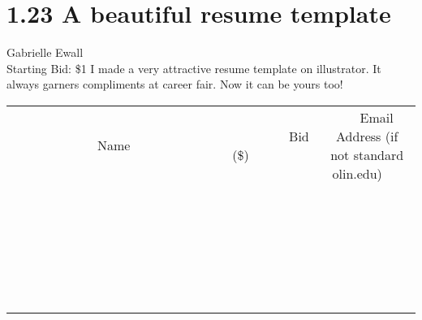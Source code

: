 \documentclass[11pt]{article}
\begin{document}
\section*{1.23 A beautiful resume template }
Gabrielle Ewall
\\
Starting Bid: \$1
\newline
I made a very attractive resume template on illustrator. It always garners compliments at career fair. Now it can be yours too!
\\[6ex]
\begin{tabular}{c c c}
~~~~~~~~~~~~~Name~~~~~~~~~~~~~ & ~~~~~~~~~Bid (\$)~~~~~~~~~  & ~~~Email Address (if not standard olin.edu)~~~\\
 & & \\
\hline
 & & \\
\hline
 & & \\
\hline
 & & \\
\hline
 & & \\
\hline
 & & \\
\hline
 & & \\
\hline
 & & \\
\hline
 & & \\
\hline
 & & \\
\hline
 & & \\
\hline
 & & \\
\hline
 & & \\
\hline
 & & \\
\hline
 & & \\
\hline
 & & \\
\hline
 & & \\
\hline
 & & \\
\hline
 & & \\
\hline
 & & \\
\hline
 & & \\
\hline
 & & \\
\hline
 & & \\
\hline
 & & \\
\hline
 & & \\
\hline
 & & \\
\hline
\end{tabular}
\newpage
\end{document}
